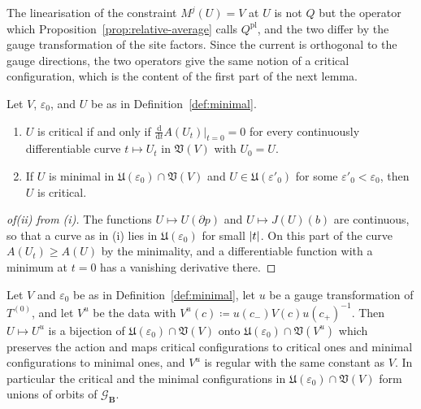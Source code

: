 \documentclass[11pt]{preprint}
\newcommand{\dd}{\mathrm{d}}
\DeclarePairedDelimiter{\abs}{\lvert}{\rvert}
\numberwithin{equation}{section}
\begin{document}
The linearisation of the constraint $M^j(U) = V$ at $U$ is not $Q$ but the operator which Proposition~\ref{prop:relative-average} calls $Q^{\mathrm{pl}}$, and the two differ by the gauge transformation of the site factors. Since the current is orthogonal to the gauge directions, the two operators give the same notion of a critical configuration, which is the content of the first part of the next lemma.

\begin{lemma}\label{lem:critical}
Let $V$, $\varepsilon_0$, and $U$ be as in Definition~\ref{def:minimal}.
\begin{enumerate}[label=(\roman*)]
\item $U$ is critical if and only if $\frac{\dd}{\dd t}A(U_t)|_{t=0} = 0$ for every continuously differentiable curve $t \mapsto U_t$ in $\mathfrak V(V)$ with $U_0 = U$.
\item If $U$ is minimal in $\mathfrak U(\varepsilon_0) \cap \mathfrak V(V)$ and $U \in \mathfrak U(\varepsilon'_0)$ for some $\varepsilon'_0 < \varepsilon_0$, then $U$ is critical.
\end{enumerate}
\end{lemma}

\begin{proof}[of(ii) from (i)]
The functions $U \mapsto U(\partial p)$ and $U \mapsto J(U)(b)$ are continuous, so that a curve as in (i) lies in $\mathfrak U(\varepsilon_0)$ for small $\abs t$. On this part of the curve $A(U_t) \geqslant A(U)$ by the minimality, and a differentiable function with a minimum at $t = 0$ has a vanishing derivative there.
\end{proof}

\begin{lemma}\label{lem:problem-covariance}
Let $V$ and $\varepsilon_0$ be as in Definition~\ref{def:minimal}, let $u$ be a gauge transformation of $T^{(0)}$, and let $V^u$ be the data with $V^u(c) \coloneqq u(c_-)V(c)u(c_+)^{-1}$. Then $U \mapsto U^u$ is a bijection of $\mathfrak U(\varepsilon_0) \cap \mathfrak V(V)$ onto $\mathfrak U(\varepsilon_0) \cap \mathfrak V(V^u)$ which preserves the action and maps critical configurations to critical ones and minimal configurations to minimal ones, and $V^u$ is regular with the same constant as $V$. In particular the critical and the minimal configurations in $\mathfrak U(\varepsilon_0) \cap \mathfrak V(V)$ form unions of orbits of $\mathcal G_{\mathbf B}$.
\end{lemma}
\end{document}
